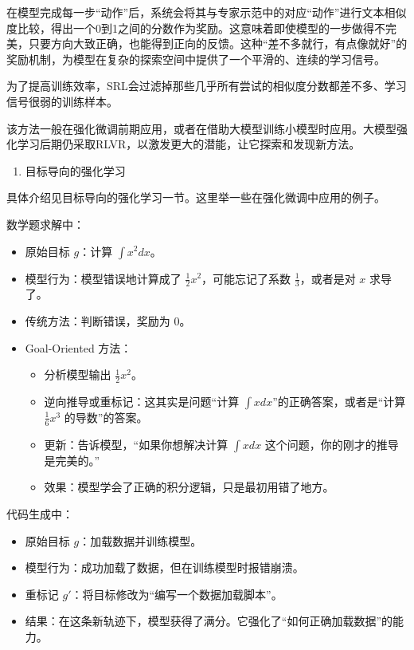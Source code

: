 在模型完成每一步``动作''后，系统会将其与专家示范中的对应``动作''进行文本相似度比较，得出一个0到1之间的分数作为奖励。这意味着即使模型的一步做得不完美，只要方向大致正确，也能得到正向的反馈。这种``差不多就行，有点像就好''的奖励机制，为模型在复杂的探索空间中提供了一个平滑的、连续的学习信号。

为了提高训练效率，SRL会过滤掉那些几乎所有尝试的相似度分数都差不多、学习信号很弱的训练样本。

该方法一般在强化微调前期应用，或者在借助大模型训练小模型时应用。大模型强化学习后期仍采取RLVR，以激发更大的潜能，让它探索和发现新方法。

\begin{enumerate}
\def\labelenumi{\arabic{enumi}.}
\setcounter{enumi}{2}
\tightlist
\item
  目标导向的强化学习
\end{enumerate}

具体介绍见目标导向的强化学习一节。这里举一些在强化微调中应用的例子。

数学题求解中：

\begin{itemize}
\tightlist
\item
  原始目标 \(g\)：计算 \(\int x^2 dx\)。
\item
  模型行为：模型错误地计算成了 \(\frac{1}{2}x^2\)，可能忘记了系数 \(\frac{1}{3}\)，或者是对 \(x\) 求导了。
\item
  传统方法：判断错误，奖励为 0。
\item
  Goal-Oriented 方法：

  \begin{itemize}
  \tightlist
  \item
    分析模型输出 \(\frac{1}{2}x^2\)。
  \item
    逆向推导或重标记：这其实是问题``计算 \(\int x dx\)''的正确答案，或者是``计算 \(\frac{1}{6}x^3\) 的导数''的答案。
  \item
    更新：告诉模型，``如果你想解决计算 \(\int x dx\) 这个问题，你的刚才的推导是完美的。''
  \item
    效果：模型学会了正确的积分逻辑，只是最初用错了地方。
  \end{itemize}
\end{itemize}

代码生成中：

\begin{itemize}
\tightlist
\item
  原始目标 \(g\)：加载数据并训练模型。
\item
  模型行为：成功加载了数据，但在训练模型时报错崩溃。
\item
  重标记 \(g'\)：将目标修改为``编写一个数据加载脚本''。
\item
  结果：在这条新轨迹下，模型获得了满分。它强化了``如何正确加载数据''的能力。
\end{itemize}

